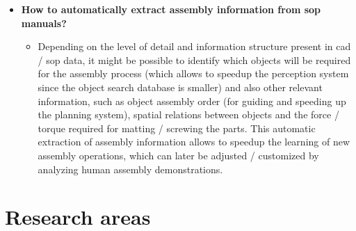 \begin{itemize}

	\item \textbf{How to automatically extract assembly information from \gls{sop} manuals?}
	\begin{itemize}
		\item Depending on the level of detail and information structure present in \gls{cad} / \gls{sop} data, it might be possible to identify which objects will be required for the assembly process (which allows to speedup the perception system since the object search database is smaller) and also other relevant information, such as object assembly order (for guiding and speeding up the planning system), spatial relations between objects and the force / torque required for matting / screwing the parts. This automatic extraction of assembly information allows to speedup the learning of new assembly operations, which can later be adjusted / customized by analyzing human assembly demonstrations.
	\end{itemize}
\end{itemize}



\section{Research areas}

